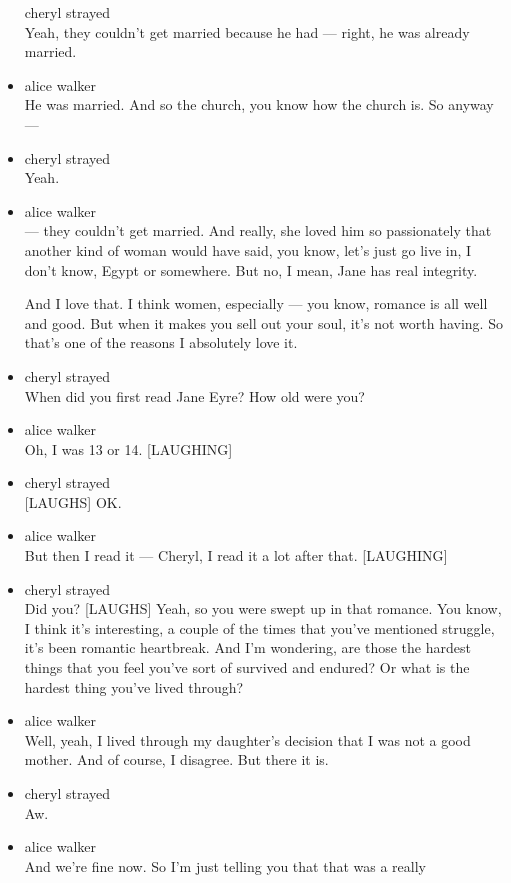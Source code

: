 \begin{itemize}
  cheryl strayed\\
  Yeah, they couldn't get married because he had --- right, he was
  already married.
\item
  alice walker\\
  He was married. And so the church, you know how the church is. So
  anyway ---
\item
  cheryl strayed\\
  Yeah.
\item
  alice walker\\
  --- they couldn't get married. And really, she loved him so
  passionately that another kind of woman would have said, you know,
  let's just go live in, I don't know, Egypt or somewhere. But no, I
  mean, Jane has real integrity.

  And I love that. I think women, especially --- you know, romance is
  all well and good. But when it makes you sell out your soul, it's not
  worth having. So that's one of the reasons I absolutely love it.
\item
  cheryl strayed\\
  When did you first read Jane Eyre? How old were you?
\item
  alice walker\\
  Oh, I was 13 or 14. {[}LAUGHING{]}
\item
  cheryl strayed\\
  {[}LAUGHS{]} OK.
\item
  alice walker\\
  But then I read it --- Cheryl, I read it a lot after that.
  {[}LAUGHING{]}
\item
  cheryl strayed\\
  Did you? {[}LAUGHS{]} Yeah, so you were swept up in that romance. You
  know, I think it's interesting, a couple of the times that you've
  mentioned struggle, it's been romantic heartbreak. And I'm wondering,
  are those the hardest things that you feel you've sort of survived and
  endured? Or what is the hardest thing you've lived through?
\item
  alice walker\\
  Well, yeah, I lived through my daughter's decision that I was not a
  good mother. And of course, I disagree. But there it is.
\item
  cheryl strayed\\
  Aw.
\item
  alice walker\\
  And we're fine now. So I'm just telling you that that was a really

\end{itemize}
